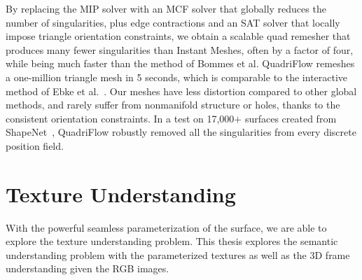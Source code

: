 By replacing the MIP solver with an MCF solver that globally reduces the number of singularities, plus edge contractions and an SAT solver that locally impose triangle orientation constraints, we obtain a scalable quad remesher that produces many fewer singularities than Instant Meshes, often by a factor of four, while being much faster than the method of Bommes et al. QuadriFlow remeshes a one-million triangle mesh in 5 seconds, which is comparable to the interactive method of Ebke et al.~\cite{ebke2016interactively}. Our meshes have less distortion compared to other global methods, and rarely suffer from nonmanifold structure or holes, thanks to the consistent orientation constraints. In a test on 17,000$+$ surfaces created from ShapeNet~\cite{chang2015shapenet}, QuadriFlow robustly removed all the singularities from every discrete position field.
 
\section{Texture Understanding}
\label{intro:understand}
With the powerful seamless parameterization of the surface, we are able to explore the texture understanding problem. This thesis explores the semantic understanding problem with the parameterized textures as well as the 3D frame understanding given the RGB images.

